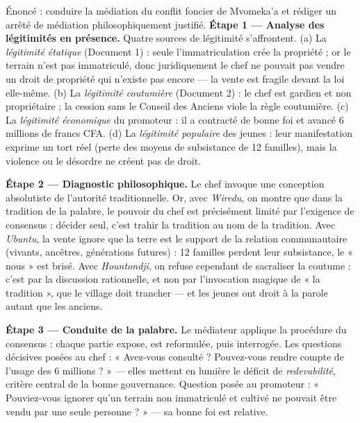 \documentclass[11pt]{article}
\begin{document}
\begin{exoresolu}
Énoncé : conduire la médiation du conflit foncier de Mvomeka'a et rédiger un arrêté de médiation philosophiquement justifié.
\tcblower
\textbf{Étape 1 — Analyse des légitimités en présence.} Quatre sources de légitimité s'affrontent. (a) La \emph{légitimité étatique} (Document 1) : seule l'immatriculation crée la propriété ; or le terrain n'est pas immatriculé, donc juridiquement le chef ne pouvait pas vendre un droit de propriété qui n'existe pas encore — la vente est fragile devant la loi elle-même. (b) La \emph{légitimité coutumière} (Document 2) : le chef est gardien et non propriétaire ; la cession sans le Conseil des Anciens viole la règle coutumière. (c) La \emph{légitimité économique} du promoteur : il a contracté de bonne foi et avancé 6 millions de francs CFA. (d) La \emph{légitimité populaire} des jeunes : leur manifestation exprime un tort réel (perte des moyens de subsistance de 12 familles), mais la violence ou le désordre ne créent pas de droit.

\textbf{Étape 2 — Diagnostic philosophique.} Le chef invoque une conception absolutiste de l'autorité traditionnelle. Or, avec \emph{Wiredu}, on montre que dans la tradition de la palabre, le pouvoir du chef est précisément limité par l'exigence de consensus : décider seul, c'est trahir la tradition au nom de la tradition. Avec \emph{Ubuntu}, la vente ignore que la terre est le support de la relation communautaire (vivants, ancêtres, générations futures) : 12 familles perdent leur subsistance, le « nous » est brisé. Avec \emph{Hountondji}, on refuse cependant de sacraliser la coutume : c'est par la discussion rationnelle, et non par l'invocation magique de « la tradition », que le village doit trancher — et les jeunes ont droit à la parole autant que les anciens.

\textbf{Étape 3 — Conduite de la palabre.} Le médiateur applique la procédure du consensus : chaque partie expose, est reformulée, puis interrogée. Les questions décisives posées au chef : « Avez-vous consulté ? Pouvez-vous rendre compte de l'usage des 6 millions ? » — elles mettent en lumière le déficit de \emph{redevabilité}, critère central de la bonne gouvernance. Question posée au promoteur : « Pouviez-vous ignorer qu'un terrain non immatriculé et cultivé ne pouvait être vendu par une seule personne ? » — sa bonne foi est relative.


\end{exoresolu}
\end{document}
